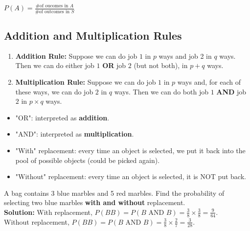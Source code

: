 \begin{remark}
    $\displaystyle P(A) = \frac{\text{\# of oucomes in $A$}}{\text{\# of outcomes in $S$}}$
\end{remark}

\subsection{Addition and Multiplication Rules}

\begin{definition}
    \phantom{}
    \begin{enumerate}
        \item \textbf{Addition Rule:} Suppose we can do job $1$ in $p$ ways and job 2 in $q$ ways.
        Then we can do either job $1$ \textbf{OR} job $2$ (but not both), in $p + q$ ways.
        \item \textbf{Multiplication Rule:} Suppose we can do job $1$ in $p$ ways and,
        for each of these ways, we can do job $2$ in $q$ ways. Then we can do both
        job $1$ \textbf{AND} job $2$ in $p \times q$ ways.
    \end{enumerate}
\end{definition}

\begin{note}
    \phantom{}
    \begin{itemize}
        \item "OR": interpreted as \textbf{addition}.
        \item "AND": interpreted as \textbf{multiplication}.
        \item "With" replacement: every time an object is selected, we put it back into the pool of possible objects (could be picked again).
        \item "Without" replacement: every time an object is selected, it is NOT put back.
    \end{itemize}
\end{note}

\begin{example}
    A bag contains 3 blue marbles and 5 red marbles. Find the probability of selecting two blue marbles \textbf{with and without} replacement.  \\
    \textbf{Solution: } With replacement, $P(BB) = P(B \text{ AND } B) = \frac{3}{8} \times \frac{3}{8} = \frac{9}{64}$.    \\
    Without replacement, $P(BB) = P(B \text{ AND } B) = \frac{3}{8} \times \frac{2}{7} = \frac{3}{28}$.
\end{example}


